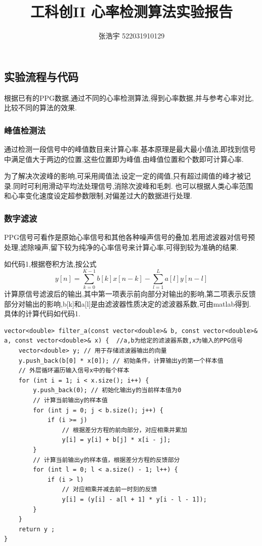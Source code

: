 \documentclass[12pt, a4paper, oneside]{ctexart}
\title{\textbf{工科创II 心率检测算法实验报告}}
\author{张浩宇 522031910129}
\date{}
\begin{document}
    \maketitle
    \subsection{实验流程与代码}
    根据已有的PPG数据,通过不同的心率检测算法,得到心率数据,并与参考心率对比,比较不同的算法的效果.
    \subsubsection{峰值检测法}
    通过检测一段信号中的峰值数目来计算心率.基本原理是最大最小值法,即找到信号中满足值大于两边的位置,这些位置即为峰值.由峰值位置和个数即可计算心率.
    
    为了解决次波峰的影响,可采用阈值法,设定一定的阈值,只有超过阈值的峰才被记录.同时可利用滑动平均法处理信号,消除次波峰和毛刺.
    也可以根据人类心率范围和心率变化速度设定超参数限制,对偏差过大的数据进行处理.
    \subsubsection{数字滤波}
    PPG信号可看作是原始心率信号和其他各种噪声信号的叠加,若用滤波器对信号预处理,滤除噪声,留下较为纯净的心率信号来计算心率,可得到较为准确的结果.

    如代码1,根据卷积方法,按公式
    $$
    y[n]=\sum_{k=0}^{K-1} b[k]x[n-k]-\sum_{l=1}^{L}a[l]y[n-l]
    $$
    计算原信号滤波后的输出,其中第一项表示前向部分对输出的影响,第二项表示反馈部分对输出的影响,b[k]和a[l]是由滤波器性质决定的滤波器系数,可由matlab得到.
    具体的计算代码如代码1.
    \newpage

    \begin{lstlisting}[caption={数字滤波}]
vector<double> filter_a(const vector<double>& b, const vector<double>& a, const vector<double>& x) {  //a,b为给定的滤波器系数,x为输入的PPG信号
    vector<double> y; // 用于存储滤波器输出的向量
    y.push_back(b[0] * x[0]); // 初始条件，计算输出y的第一个样本值
    // 外层循环遍历输入信号x中的每个样本
    for (int i = 1; i < x.size(); i++) {
        y.push_back(0); // 初始化输出y的当前样本值为0
        // 计算当前输出y的样本值
        for (int j = 0; j < b.size(); j++) {
            if (i >= j) 
                // 根据差分方程的前向部分，对应相乘并累加
                y[i] = y[i] + b[j] * x[i - j];
        }
        // 计算当前输出y的样本值，根据差分方程的反馈部分
        for (int l = 0; l < a.size() - 1; l++) {
            if (i > l) 
                // 对应相乘并减去前一时刻的反馈
                y[i] = (y[i] - a[l + 1] * y[i - l - 1]);
        }
    }
    return y ; 
}
    \end{lstlisting}
\end{document}
